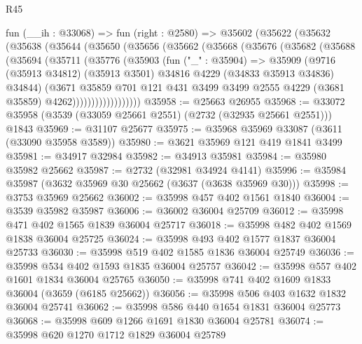 \begin{lexlean}{R45}
\begin{coremodule}
    fun (__ih : @33068) =>
    fun (right : @2580) =>
    @35602
      (@35622
        (@35632
          (@35638
            (@35644
              (@35650
                (@35656
                  (@35662
                    (@35668
                      (@35676
                        (@35682
                          (@35688
                            (@35694
                              (@35711
                                (@35776
                                  (@35903
                                    (fun ("_" : @35904) =>
                                    @35909
                                      (@9716
                                        (@35913 @34812)
                                        (@35913 @3501)
                                        @34816
                                        @4229
                                        (@34833 @35913 @34836)
                                        @34844)
                                      (@3671
                                        @35859
                                        @701
                                        @121
                                        @431
                                        @3499
                                        @3499
                                        @2555
                                        @4229
                                        (@3681 @35859)
                                        @4262))))))))))))))))))
@35958 := @25663 @26955
@35968 := @33072 @35958 (@3539 (@33059 @25661 @2551) (@2732 (@32935 @25661 @2551))) @1843
@35969 := @31107 @25677
@35975 := @35968 @35969 @33087 (@3611 (@33090 @35958 @3589))
@35980 := @3621 @35969 @121 @419 @1841 @3499
@35981 := @34917 @32984
@35982 := @34913 @35981
@35984 := @35980 @35982 @25662
@35987 := @2732 (@32981 @34924 @4141)
@35996 := @35984 @35987 (@3632 @35969 @30 @25662 (@3637 (@3638 @35969 @30)))
@35998 := @3753 @35969 @25662
@36002 := @35998 @457 @402 @1561 @1840
@36004 := @3539 @35982 @35987
@36006 := @36002 @36004 @25709
@36012 := @35998 @471 @402 @1565 @1839 @36004 @25717
@36018 := @35998 @482 @402 @1569 @1838 @36004 @25725
@36024 := @35998 @493 @402 @1577 @1837 @36004 @25733
@36030 := @35998 @519 @402 @1585 @1836 @36004 @25749
@36036 := @35998 @534 @402 @1593 @1835 @36004 @25757
@36042 := @35998 @557 @402 @1601 @1834 @36004 @25765
@36050 := @35998 @741 @402 @1609 @1833 @36004 (@3659 (@6185 @25662))
@36056 := @35998 @506 @403 @1632 @1832 @36004 @25741
@36062 := @35998 @586 @440 @1654 @1831 @36004 @25773
@36068 := @35998 @609 @1266 @1691 @1830 @36004 @25781
@36074 := @35998 @620 @1270 @1712 @1829 @36004 @25789

\end{coremodule}
\end{lexlean}
